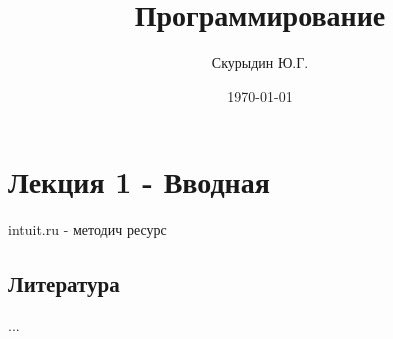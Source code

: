 \documentclass[a4paper, 12pt]{article}
\title{Программирование}
\author{Скурыдин Ю.Г.}
\date{\today}
\begin{document}
\maketitle
\section{Лекция 1 - Вводная}
intuit.ru - методич ресурс\\




\subsection*{Литература}
...\\ 
\end{document}
